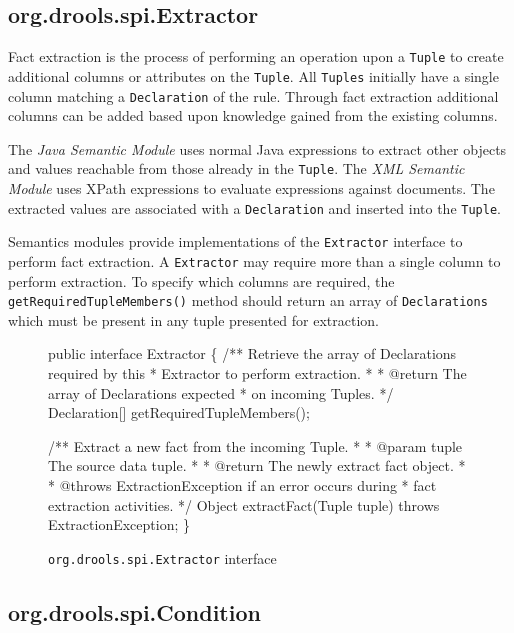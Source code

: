 \subsection{org.drools.spi.Extractor}

Fact extraction is the process of performing an operation upon a
\verb|Tuple| to create additional columns or attributes on the
\verb|Tuple|.  All \verb|Tuples| initially have a single column
matching a \verb|Declaration| of the rule.  Through fact
extraction additional columns can be added based upon knowledge
gained from the existing columns.

The \emph{Java Semantic Module} uses normal Java expressions to
extract other objects and values reachable from those already in the
\verb|Tuple|.  The \emph{XML Semantic Module} uses
XPath\cite{clark99xpath} expressions
to evaluate expressions against documents.  The extracted values are
associated with a \verb|Declaration| and inserted into the
\verb|Tuple|.

Semantics modules provide implementations of the \verb|Extractor|
interface to perform fact extraction. A \verb|Extractor| may
require more than a single column to perform extraction.  To specify
which columns are required, the \verb|getRequiredTupleMembers()| 
method should return an array of \verb|Declarations| which must 
be present in any tuple presented for extraction.

\begin{figure}
\begin{codelisting}
public interface Extractor
\{
    /** Retrieve the array of Declarations required by this 
     *  Extractor to perform extraction.
     *
     *  @return The array of Declarations expected 
     *          on incoming Tuples.
     */
    Declaration[] getRequiredTupleMembers();

    /** Extract a new fact from the incoming Tuple.
     *
     *  @param tuple The source data tuple.
     *
     *  @return The newly extract fact object.
     *
     *  @throws ExtractionException if an error occurs during
     *          fact extraction activities.
     */
    Object extractFact(Tuple tuple) throws ExtractionException;
\}
\end{codelisting}
\label{code.Extractor}
\caption{\texttt{org.drools.spi.Extractor} interface}
\end{figure}

\subsection{org.drools.spi.Condition}

